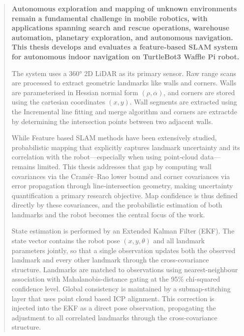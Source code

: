 \documentclass[11pt]{article}
\begin{document}
	
	\begin{abstract}
		\bfseries
		\noindent
		Autonomous exploration and mapping of unknown environments remain a fundamental challenge in mobile robotics, with applications spanning search and rescue operations, warehouse automation, planetary exploration, and autonomous navigation. This thesis develops and evaluates a feature-based SLAM system for autonomous indoor navigation on TurtleBot3 Waffle Pi robot.
		
		\vspace{0.5em}
		\noindent
		The system uses a 360° 2D LiDAR as its primary sensor. Raw range scans are processed to extract geometric landmarks like walls and corners. Walls are parameterised in Hessian normal form $(\rho, \alpha)$, and corners are stored using the cartesian coordinates $(x, y)$. Wall segments are extracted using the Incremental line fitting and merge algorithm and corners are extractde by determining the intersection points between two adjacent walls.
		
		\vspace{0.5em}
		\noindent
		While Feature based SLAM methods have been extensively studied, probabilistic mapping that explicitly captures landmark uncertainty and its correlation with the robot—especially when using point‑cloud data—remains limited. This thesis addresses that gap by computing wall covariances via the Cramér–Rao lower bound and corner covariances via error propagation through line‑intersection geometry, making uncertainty quantification a primary research objective. Map confidence is thus defined directly by these covariances, and the probabilistic estimation of both landmarks and the robot becomes the central focus of the work.
			 	
		\vspace{0.5em}
		\noindent
		State estimation is performed by an Extended Kalman Filter (EKF). The state vector contains the robot pose $(x, y, \theta)$ and all landmark parameters jointly, so that a single observation updates both the observed landmark and every other landmark through the cross-covariance structure. Landmarks are matched to observations using nearest-neighbour association with Mahalanobis-distance gating at the 95\% chi-squared confidence level. Global consistency is maintained by a submap-stitching layer that uses point cloud based ICP alignment. This correction is injected into the EKF as a direct pose observation, propagating the adjustment to all correlated landmarks through the cross-covariance structure.
		

\end{abstract}
\end{document}
